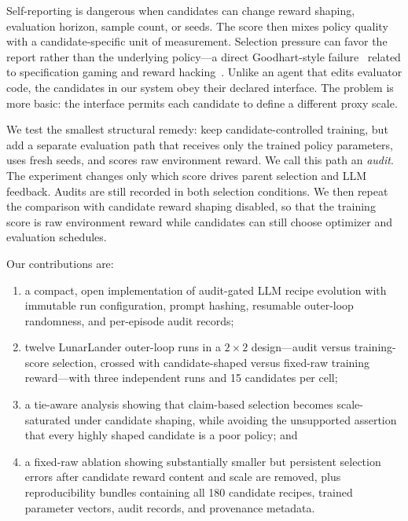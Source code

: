 \documentclass[11pt]{article}
\begin{document}
Self-reporting is dangerous when candidates can change reward shaping, evaluation horizon, sample
count, or seeds. The score then mixes policy quality with a candidate-specific unit of
measurement. Selection pressure can favor the report rather than the underlying policy---a direct
Goodhart-style failure~\citep{manheim2018categorizing} related to specification gaming and reward
hacking~\citep{krakovna2020specification,lehman2020surprising,skalse2022defining,
pan2022effects,amodei2016concrete}. Unlike an agent that edits evaluator code, the candidates in
our system obey their declared interface. The problem is more basic: the interface permits each
candidate to define a different proxy scale.

We test the smallest structural remedy: keep candidate-controlled training, but add a separate
evaluation path that receives only the trained policy parameters, uses fresh seeds, and scores raw
environment reward. We call this path an \emph{audit}. The experiment changes only which score
drives parent selection and LLM feedback. Audits are still recorded in both selection conditions.
We then repeat the comparison with candidate reward shaping disabled, so that the training score
is raw environment reward while candidates can still choose optimizer and evaluation schedules.

Our contributions are:
\begin{enumerate}
  \item a compact, open implementation of audit-gated LLM recipe evolution with immutable run
  configuration, prompt hashing, resumable outer-loop randomness, and per-episode audit records;
  \item twelve LunarLander outer-loop runs in a $2\times2$ design---audit versus training-score
  selection, crossed with candidate-shaped versus fixed-raw training reward---with three
  independent runs and 15 candidates per cell;
  \item a tie-aware analysis showing that claim-based selection becomes scale-saturated under
  candidate shaping, while avoiding the unsupported assertion that every highly shaped candidate
  is a poor policy; and
  \item a fixed-raw ablation showing substantially smaller but persistent selection errors after
  candidate reward content and scale are removed, plus reproducibility bundles containing all
  180 candidate recipes, trained parameter vectors, audit records, and provenance metadata.
\end{enumerate}
\end{document}
